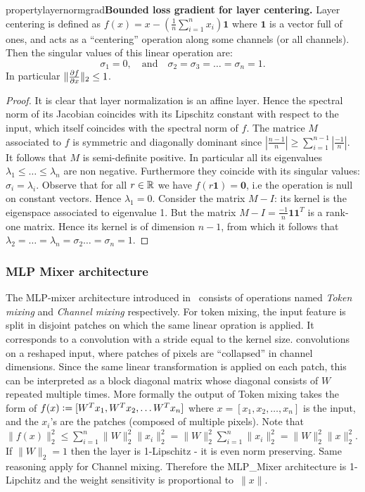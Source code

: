     \begin{restatable}{property}{layernormgrad}{\normalfont\textbf{Bounded loss gradient for layer centering.}}
        Layer centering is defined as $f(x)=x-(\frac{1}{n}\sum_{i=1}^n x_i)\mathbf{1}$ where $\mathbf{1}$ is a vector full of ones, and acts as a ``centering'' operation along some channels (or all channels). Then the singular values of this linear operation are:
        \begin{equation}
            \sigma_1 = 0,\quad\text{and}\quad\sigma_2=\sigma_3=\ldots =\sigma_n = 1.
        \end{equation}
        In particular $\|\frac{\partial f}{\partial x}\|_2\leq 1$.
    \end{restatable}
    \begin{proof}
        It is clear that layer normalization is an affine layer. Hence the spectral norm of its Jacobian coincides with its Lipschitz constant with respect to the input, which itself coincides with the spectral norm of $f$.
        The matrice $M$ associated to $f$ is symmetric and diagonally dominant since $|\frac{n-1}{n}|\geq \sum_{i=1}^{n-1} |\frac{-1}{n}|$. It follows that $M$ is semi-definite positive. In particular all its eigenvalues $\lambda_1\leq \ldots \leq \lambda_n$ are non negative. Furthermore they coincide with its singular values: $\sigma_i=\lambda_i$.  
        Observe that for all $r\in\mathbb{R}$ we have $f(r\mathbf{1})=\mathbf{0}$, i.e the operation is null on constant vectors. Hence $\lambda_1=0$. Consider the matrix $M-I$: its kernel is the eigenspace associated to eigenvalue 1. But the matrix $M-I=\frac{-1}{n}\mathbf{1}\mathbf{1}^T$ is a rank-one matrix. Hence its kernel is of dimension $n-1$, from which it follows that $\lambda_2=\ldots =\lambda_n=\sigma_2\ldots =\sigma_n=1$.
    \end{proof}

    
    \subsubsection{MLP Mixer architecture}
    
    The MLP-mixer architecture introduced in~\cite{tolstikhin2021mlp} consists of operations named \textit{Token mixing} and \textit{Channel mixing} respectively. For token mixing, the input feature is split in disjoint patches on which the same linear opration is applied. It corresponds to a convolution with a stride equal to the kernel size. convolutions on a reshaped input, where patches of pixels are ``collapsed'' in channel dimensions.
    Since the same linear transformation is applied on each patch, this can be interpreted as a block diagonal matrix whose diagonal consists of $W$ repeated multiple times.
    More formally the output of Token mixing takes the form of $f(x)\vcentcolon=[W^Tx_1,W^Tx_2,\ldots W^Tx_n]$ where $x=[x_1,x_2,\ldots ,x_n]$ is the input, and the $x_i$'s are the patches (composed of multiple pixels). Note that $\|f(x)\|_2^2\leq \sum_{i=1}^n \|W\|_2^2\|x_i\|_2^2=\|W\|_2^2\sum_{i=1}^n \|x_i\|_2^2=\|W\|_2^2\|x\|_2^2$. If $\|W\|_2=1$ then the layer is 1-Lipschitz - it is even norm preserving. Same reasoning apply for Channel mixing. Therefore the MLP\_Mixer architecture is 1-Lipchitz and the weight sensitivity is proportional to~$\|x\|$.

